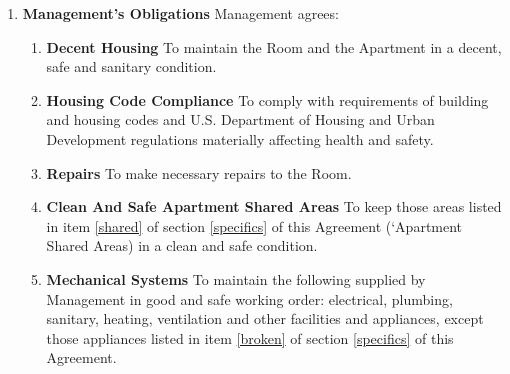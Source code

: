 \documentclass[12pt,letterpaper]{article}
\newcommand{\management}{Management}
\newcommand{\condo}{Wilson Manor}
\newcommand{\apt}{Apartment}
\newcommand{\room}{Room}
\newcommand{\shared}{Apartment Shared Areas}
\newcommand{\lodger}{Lodger}
\begin{document}
\begin{enumerate}
\begin{enumerate}
			\item \textbf{Rubbish Removal} \quad To dispose of all ashes, garbage, rubbish and other waste from the \room{} in a sanitary and safe manner in the receptacles and trash bins provided by \management{} or owned by \lodger{}. 
			\item \textbf{Care In Use Of Facilities} \quad To use only in a reasonable and safe manner all electrical, plumbing, sanitary, heating, ventilating, air-conditioning and other facilities and appurtenances. 
			\item \textbf{Damage To \room{}, \apt{}, Or \condo{}} \quad No \lodger{}, or guest, or other person under their control shall deface, paint, damage, destroy, tamper with or remove any part of the \room{}, \apt{}, Or \condo{}.
			\item \textbf{Alterations} \quad To make no repairs, alterations or additions of any kind without the prior written consent of \management{}, including but not limited to, painting, changing locks, or installing security bars, doors or safety devices. \management{} may withhold such consent at \management{}'s sole discretion. 
			\item \textbf{Signs} \quad Not to display on or about the \room{}, \apt{}, or \condo{} any signs or advertisements of any kind including, but not limited to, signs for goods or services. 
		\end{enumerate}
	\item \textbf{Management's Obligations} \quad
		\management{} agrees: 
		\begin{enumerate}
			\item \textbf{Decent Housing} \quad To maintain the \room{} and the \apt{} in a decent, safe and sanitary condition. 
			\item \textbf{Housing Code Compliance} \quad To comply with requirements of building and housing codes and U.S. Department of Housing and Urban Development regulations materially affecting health and safety. 
			\item \textbf{Repairs} \quad To make necessary repairs to the \room{}. 
			\item \textbf{Clean And Safe \shared{}} \quad To keep those areas listed in item \ref{shared} of section \ref{specifics} of this Agreement (`\shared{}) in a clean and safe condition. 
			\item \textbf{Mechanical Systems} \quad To maintain the following supplied by \management{} in good and safe working order: electrical, plumbing, sanitary, heating, ventilation and other facilities and appliances, except those appliances listed in item \ref{broken} of section \ref{specifics} of this Agreement. 

\end{enumerate}
\end{enumerate}
\end{document}

